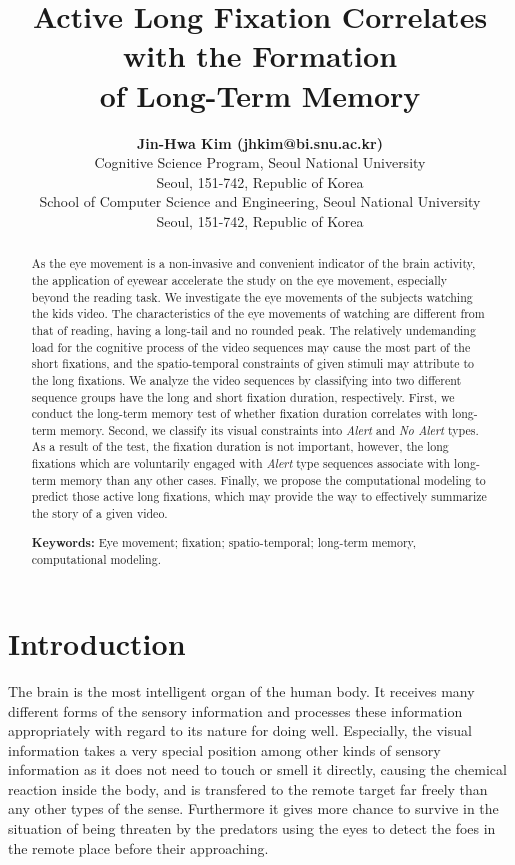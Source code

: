 \documentclass[10pt,letterpaper]{article}
\title{Active Long Fixation Correlates with the Formation \\
of Long-Term Memory}
\author{{\large \bf Jin-Hwa Kim (jhkim@bi.snu.ac.kr)} \\
  Cognitive Science Program, Seoul National University \\
  Seoul, 151-742, Republic of Korea
  \AND {\large \bf Byoung-Tak Zhang (btzhang@bi.snu.ac.kr)} \\
  School of Computer Science and Engineering, Seoul National University \\
  Seoul, 151-742, Republic of Korea}
\begin{document}
\maketitle

\begin{abstract}
As the eye movement is a non-invasive and convenient indicator of the brain activity, the application of eyewear accelerate the study on the eye movement, especially beyond the reading task. We investigate the eye movements of the subjects watching the kids video. The characteristics of the eye movements of watching are different from that of reading, having a long-tail and no rounded peak. The relatively undemanding load for the cognitive process of the video sequences may cause the most part of the short fixations, and the spatio-temporal constraints of given stimuli may attribute to the long fixations. We analyze the video sequences by classifying into two different sequence groups have the long and short fixation duration, respectively. First, we conduct the long-term memory test of whether fixation duration correlates with long-term memory. Second, we classify its visual constraints into \textit{Alert} and \textit{No Alert} types. As a result of the test, the fixation duration is not important, however, the long fixations which are voluntarily engaged with \textit{Alert} type sequences associate with long-term memory than any other cases. Finally, we propose the computational modeling to predict those active long fixations, which may provide the way to effectively summarize the story of a given video.

\textbf{Keywords:} 
Eye movement; fixation; spatio-temporal; long-term memory, computational modeling.
\end{abstract}


\section{Introduction}

The brain is the most intelligent organ of the human body. It receives many different forms of the sensory information and processes these information appropriately with regard to its nature for doing well. Especially, the visual information takes a very special position among other kinds of sensory information as it does not need to touch or smell it directly, causing the chemical reaction inside the body, and is transfered to the remote target far freely than any other types of the sense. Furthermore it gives more chance to survive in the situation of being threaten by the predators using the eyes to detect the foes in the remote place before their approaching. 
\end{document}

